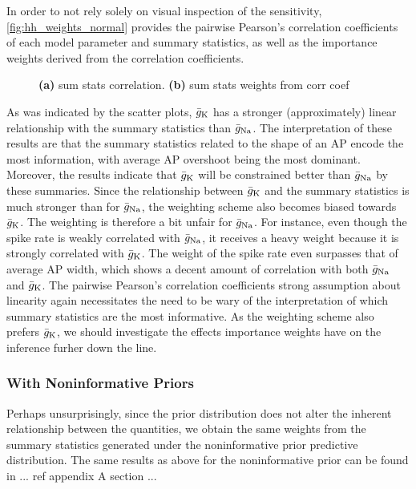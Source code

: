 In order to not rely solely on visual inspection of the sensitivity, \autoref{fig:hh_weights_normal} provides the pairwise Pearson's correlation coefficients of each model parameter and summary statistics, as well as the importance weights derived from the correlation coefficients.
\begin{figure}[!htb]
\centering
{}
\qquad
{}
\caption{\textbf{(a)} sum stats correlation. \textbf{(b)} sum stats weights from corr coef
}
\label{fig:hh_weights_normal}
\end{figure}
As was indicated by the scatter plots, $\bar{g}_{\mathrm{K}}$ has a stronger (approximately) linear relationship with the summary statistics than $\bar{g}_{\mathrm{Na}}$. The interpretation of these results are that the summary statistics related to the shape of an AP encode the most information, with average AP overshoot being the most dominant. Moreover, the results indicate that $\bar{g}_{\mathrm{K}}$ will be constrained better than $\bar{g}_{\mathrm{Na}}$ by these summaries. Since the relationship between $\bar{g}_{\mathrm{K}}$ and the summary statistics is much stronger than for $\bar{g}_{\mathrm{Na}}$, the weighting scheme also becomes biased towards $\bar{g}_{\mathrm{K}}$. The weighting is therefore a bit unfair for $\bar{g}_{\mathrm{Na}}$. For instance, even though the spike rate is weakly correlated with $\bar{g}_{\mathrm{Na}}$, it receives a heavy weight because it is strongly correlated with $\bar{g}_{\mathrm{K}}$. The weight of the spike rate even surpasses that of average AP width, which shows a decent amount of correlation with both $\bar{g}_{\mathrm{Na}}$ and $\bar{g}_{\mathrm{K}}$. The pairwise Pearson's correlation coefficients strong assumption about linearity again necessitates the need to be wary of the interpretation of which summary statistics are the most informative. As the weighting scheme also prefers $\bar{g}_{\mathrm{K}}$, we should investigate the effects importance weights have on the inference furher down the line.

\subsubsection*{With Noninformative Priors}

Perhaps unsurprisingly, since the prior distribution does not alter the inherent relationship between the quantities, we obtain the same weights from the summary statistics generated under the noninformative prior predictive distribution. The same results as above for the noninformative prior can be found in ... ref appendix A section ...

